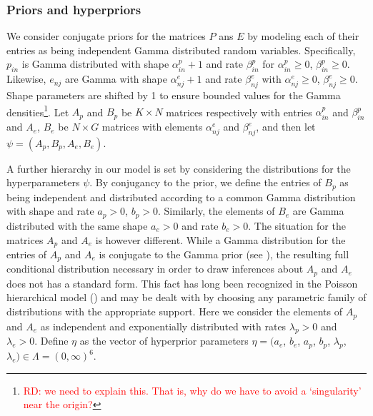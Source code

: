 \documentclass{bioinfo}
\begin{document}
\subsubsection{Priors and hyperpriors} 
We consider conjugate priors for the matrices $P$ ans $E$ by modeling
each of their entries as being independent Gamma distributed random
variables. Specifically, $p_{in}$ is Gamma distributed with shape
$\alpha_{in}^p + 1$ and rate $\beta_{in}^p$ for $\alpha_{in}^p
\geqslant 0$, $\beta_{in}^p \geqslant 0$. Likewise, $e_{nj}$ are Gamma
with shape $\alpha_{nj}^e+1$ and rate $\beta_{nj}^e$ with
$\alpha_{nj}^e \geqslant 0$, $\beta_{nj}^e \geqslant 0$. Shape
parameters are shifted by 1 to ensure bounded values for the Gamma
densities\footnote{\textcolor{red}{RD: we need to explain this.  That
is, why do we have to avoid a `singularity' near the origin?}}. Let
$A_p$ and $B_p$ be $K\times N$ matrices respectively with entries
$\alpha_{in}^p$ and $\beta_{in}^p$ and $A_e$, $B_e$ be $N\times G$
matrices with elements $\alpha_{nj}^e$ and $\beta_{nj}^e$, and then
let $\psi = (A_p, B_p, A_e, B_e)$.


A further hierarchy in our model is set by considering the
distributions for the hyperparameters $\psi$. By conjugancy to the
prior, we define the entries of $B_p$ as being independent and
distributed according to a common Gamma distribution with shape and
rate $a_p > 0$, $b_p > 0$. Similarly, the elements of $B_e$ are Gamma
distributed with the same shape $a_e>0$ and rate $b_e>0$. The
situation for the matrices $A_p$ and $A_e$ is however different. While
a Gamma distribution for the entries of $A_p$ and $A_e$ is conjugate
to the Gamma prior (see \citealp{M}), the resulting full conditional
distribution necessary in order to draw inferences about $A_p$ and
$A_e$ does not has a standard form.  This fact has long been
recognized in the Poisson hierarchical model (\citealp{GMS93}) and may
be dealt with by choosing any parametric family of
distributions with the appropriate support. Here we consider the
elements of $A_p$ and $A_e$ as independent and exponentially
distributed with rates $\lambda_p > 0$ and $\lambda_e > 0$.  Define
$\eta$ as the vector of hyperprior parameters $\eta = (a_e$, $b_e$,
$a_p$, $b_p$, $\lambda_p$, $\lambda_e) \in \Lambda = (0, \infty)^6$.
\end{document}
